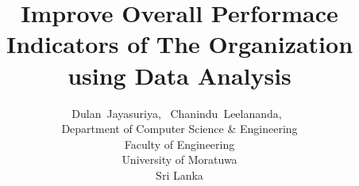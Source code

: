 %
%




\documentclass[journal]{IEEEtran}

\usepackage{xcolor,soul,framed} %

\usepackage[pdftex]{graphicx}
\graphicspath{{../pdf/}{../jpeg/}}

\usepackage[cmex10]{amsmath}
\usepackage{array}
\usepackage{mdwmath}
\usepackage{mdwtab}
\usepackage{eqparbox}
\usepackage{url}
\usepackage{longtable}

\usepackage{hyperref}
\hypersetup{
    colorlinks=true,
    linkcolor=blue,
    filecolor=magenta,      
    urlcolor=cyan,
}





    \title{Improve Overall Performace Indicators of The Organization using Data Analysis}
  \author{Dulan~Jayasuriya,~
      Chanindu~Leelananda,~%
      \newline
      \\
Department of Computer Science \& Engineering \\

Faculty of Engineering \\
University of Moratuwa \\
Sri Lanka 
  }  


